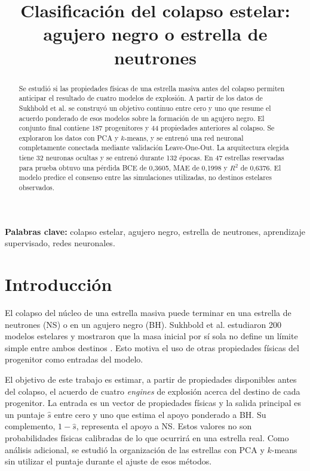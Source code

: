 \documentclass[conference,a4paper]{IEEEtran}
\title{Clasificación del colapso estelar: agujero negro o estrella de neutrones}
\author{\IEEEauthorblockN{Federico Moroni}
\IEEEauthorblockA{Universidad de San Andrés}}
\begin{document}
\maketitle

\begin{abstract}
Se estudió si las propiedades físicas de una estrella masiva antes del colapso permiten anticipar el resultado de cuatro modelos de explosión. A partir de los datos de Sukhbold et al. se construyó un objetivo continuo entre cero y uno que resume el acuerdo ponderado de esos modelos sobre la formación de un agujero negro. El conjunto final contiene 187 progenitores y 44 propiedades anteriores al colapso. Se exploraron los datos con PCA y $k$-means, y se entrenó una red neuronal completamente conectada mediante validación Leave-One-Out. La arquitectura elegida tiene 32 neuronas ocultas y se entrenó durante 132 épocas. En 47 estrellas reservadas para prueba obtuvo una pérdida BCE de 0,3605, MAE de 0,1998 y $R^2$ de 0,6376. El modelo predice el consenso entre las simulaciones utilizadas, no destinos estelares observados.
\end{abstract}

\noindent\textbf{Palabras clave:} colapso estelar, agujero negro, estrella de neutrones, aprendizaje supervisado, redes neuronales.

\section{Introducción}
El colapso del núcleo de una estrella masiva puede terminar en una estrella de neutrones (NS) o en un agujero negro (BH). Sukhbold et al. estudiaron 200 modelos estelares y mostraron que la masa inicial por sí sola no define un límite simple entre ambos destinos \cite{sukhbold}. Esto motiva el uso de otras propiedades físicas del progenitor como entradas del modelo.

El objetivo de este trabajo es estimar, a partir de propiedades disponibles antes del colapso, el acuerdo de cuatro \emph{engines} de explosión acerca del destino de cada progenitor. La entrada es un vector de propiedades físicas y la salida principal es un puntaje $\hat{s}$ entre cero y uno que estima el apoyo ponderado a BH. Su complemento, $1-\hat{s}$, representa el apoyo a NS. Estos valores no son probabilidades físicas calibradas de lo que ocurrirá en una estrella real. Como análisis adicional, se estudió la organización de las estrellas con PCA y $k$-means sin utilizar el puntaje durante el ajuste de esos métodos.
\end{document}

